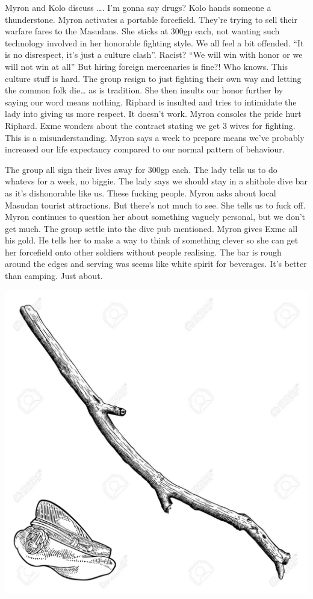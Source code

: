 \begin{multicols}{2}
Myron and Kolo discuss …. I’m gonna say drugs? Kolo hands someone a thunderstone. Myron activates a portable forcefield. They’re trying to sell their warfare fares to the Masudans. She sticks at 300gp each, not wanting such technology involved in her honorable fighting style. We all feel a bit offended. “It is no disrespect, it’s just a culture clash”. Racist? “We will win with honor or we will not win at all” But hiring foreign mercenaries is fine?! Who knows. This culture stuff is hard. The group resign to just fighting their own way and letting the common folk die… as is tradition. She then insults our honor further by saying our word means nothing. Riphard is insulted and tries to intimidate the lady into giving us more respect. It doesn’t work. Myron consoles the pride hurt Riphard. Exme wonders about the contract stating we get 3 wives for fighting. This is a misunderstanding. Myron says a week to prepare means we’ve probably increased our life expectancy compared to our normal pattern of behaviour.\medskip

The group all sign their lives away for 300gp each. The lady tells us to do whatevs for a week, no biggie. The lady says we should stay in a shithole dive bar as it’s dishonorable like us. These fucking people. Myron asks about local Masudan tourist attractions. But there’s not much to see. She tells us to fuck off. Myron continues to question her about something vaguely personal, but we don’t get much. The group settle into the dive pub mentioned. Myron gives Exme all his gold. He tells her to make a way to think of something clever so she can get her forcefield onto other soldiers without people realising. The bar is rough around the edges and serving was seems like white spirit for beverages. It’s better than camping. Just about.\medskip

\end{multicols}

\vspace*{5mm}

\begin{center}
\includegraphics[width=\textwidth]{./content/img/xxx.jpg}
\begin{figure}[h]
\end{figure}
\end{center}

\clearpage